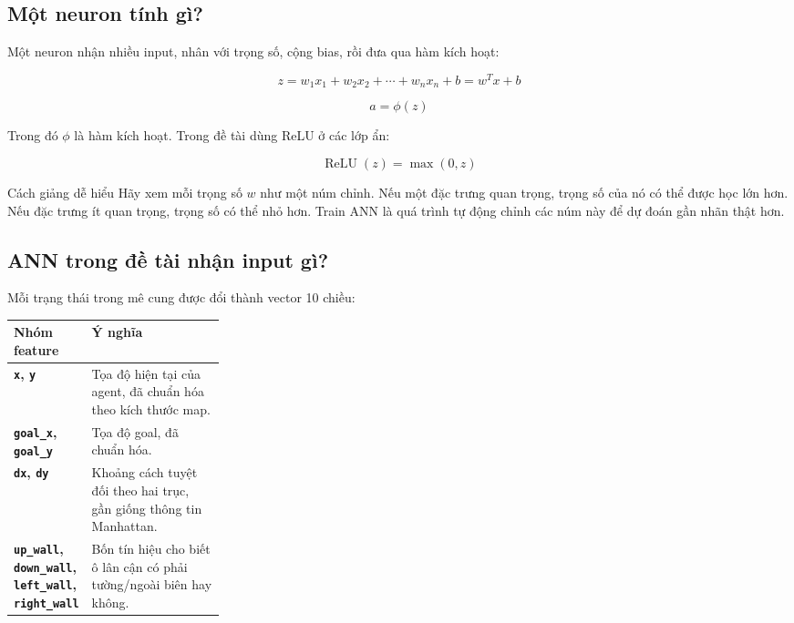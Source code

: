 \documentclass[12pt,a4paper]{article}
\newcommand{\code}[1]{\texttt{#1}}
\begin{document}
\begin{center}
\end{center}

\subsection{Một neuron tính gì?}

Một neuron nhận nhiều input, nhân với trọng số, cộng bias, rồi đưa qua hàm kích hoạt:

\[
    z = w_1x_1 + w_2x_2 + \cdots + w_nx_n + b = w^Tx + b
\]

\[
    a = \phi(z)
\]

Trong đó \(\phi\) là hàm kích hoạt. Trong đề tài dùng ReLU ở các lớp ẩn:

\[
    \operatorname{ReLU}(z)=\max(0,z)
\]

\begin{teachbox}{Cách giảng dễ hiểu}
Hãy xem mỗi trọng số \(w\) như một núm chỉnh. Nếu một đặc trưng quan trọng, trọng số của nó có thể được học lớn hơn. Nếu đặc trưng ít quan trọng, trọng số có thể nhỏ hơn. Train ANN là quá trình tự động chỉnh các núm này để dự đoán gần nhãn thật hơn.
\end{teachbox}

\subsection{ANN trong đề tài nhận input gì?}

Mỗi trạng thái trong mê cung được đổi thành vector 10 chiều:

\begin{center}
\begin{tabularx}{0.95\linewidth}{>{\bfseries}p{0.27\linewidth}X}
\toprule
Nhóm feature & Ý nghĩa \\
\midrule
\code{x}, \code{y} & Tọa độ hiện tại của agent, đã chuẩn hóa theo kích thước map. \\
\code{goal\_x}, \code{goal\_y} & Tọa độ goal, đã chuẩn hóa. \\
\code{dx}, \code{dy} & Khoảng cách tuyệt đối theo hai trục, gần giống thông tin Manhattan. \\
\code{up\_wall}, \code{down\_wall}, \code{left\_wall}, \code{right\_wall} & Bốn tín hiệu cho biết ô lân cận có phải tường/ngoài biên hay không. \\
\bottomrule
\end{tabularx}
\end{center}
\end{document}
